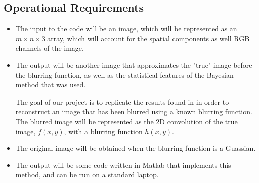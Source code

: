 \documentclass[11pt]{article}
\begin{document}
\subsection{Operational Requirements}


\begin{itemize}
\item The input to the code will be an image, which will be represented as an $m \times n \times 3$ array, which will account for the spatial components as well RGB channels of the image.  

\item The output will be another image that approximates the "true" image before the blurring function, as well as the statistical features of the Bayesian method that was used. 

The goal of our project is to replicate the results found in \cite{R01} in order to reconstruct an image that has been blurred using a known blurring function. The blurred image will be represented as the 2D convolution of the true image, $f(x,y)$, with a blurring function $h(x,y)$.
\item The original image will be obtained when the blurring function is a Guassian. 
\item The output will be some code written in Matlab that implements this method, and can be run on a standard laptop. 
\end{itemize}


\end{document}
